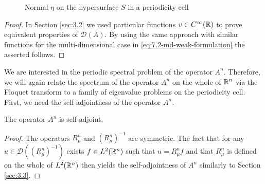 \begin{figure}[!ht] \centering
	\caption{Normal $\eta$ on the hypersurface $S$ in a periodicity cell}
\end{figure}
	
\begin{proof}
 	In Section \ref{sec:3.2} we used particular functions $v \in C^{\infty}(\mathbb{R})$ to prove equivalent properties of $\mathcal{D}(A)$. By using the same approach with similar functions for the multi-dimensional case in \eqref{eq:7.2-md-weak-formulation} the asserted follows.
\end{proof}

We are interested in the periodic spectral problem of the operator $A^{n}$. Therefore, we will again relate the spectrum of the operator $A^{n}$ on the whole of $\mathbb{R}^{n}$ via the Floquet transform to a family of eigenvalue problems on the periodicity cell. First, we need the self-adjointness of the operator $A^{n}$.

\begin{remark}
	The operator $A^{n}$ is self-adjoint.	
\end{remark}

\begin{proof}
	The operators $R_{\mu}^{n}$ and $\left(R_{\mu}^{n}\right)^{-1}$ are symmetric. The fact that for any $u \in \mathcal{D}(\left(R_{\mu}^{n}\right)^{-1})$ exists $f \in L^{2}(\mathbb{R}^{n})$ such that $u = R_{\mu}^{n} f$ and that $R_{\mu}^{n}$ is defined on the whole of $L^{2}(\mathbb{R}^{n})$ then yields the self-adjointness of $A^{n}$ similarly to Section \ref{sec:3.3}.
\end{proof}

